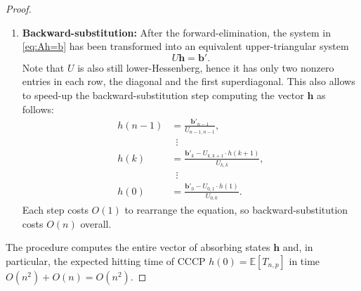\documentclass[11pt,a4paper]{article}
\newcommand{\E}{\mathbb{E}}
\begin{document}
\begin{proof}
\begin{enumerate}
    As $A$ is lower-Hessenberg, the first row has only two nonzero entries: when we subtract it from all rows below, only $O(n)$ terms are affected instead of $O(n^2)$.
    After eliminating the first column, also the second row has only two nonzero entries, and so on iteratively for every row.
    This property allows to perform the forward-elimination step efficiently.
    More formally, for each $c=0,\dots,n-2$, for each $r>c$, let $m_{r,c} := A_{r,c}/A_{c,c}$ and perform the following updates:
    \begin{align*}
        A_{r,c} &\gets A_{r,c} - m_{r,c} \cdot A_{c,c} = 0,
        \\
        A_{r,c+1} &\gets A_{r,c+1} - m_{r,c} \cdot A_{c,c+1},
        \\
        \mathbf{b}_{r} &\gets \mathbf{b}_{r} - m_{r,c} \cdot \mathbf{b}_{c}.
    \end{align*}
    For each $c$ there are $n-c-1$ entries below the diagonal that need to be eliminated, and each elimination step only updates two entries of $A$ and one entry of $\mathbf{b}$.
    Hence, summing over all columns, we have a total running time of $\sum_{c=0}^{n-2} 3(n-c-1) = O(n^2)$.

  \item \textbf{Backward-substitution:} After the forward-elimination, the system in \cref{eq:Ah=b} has been transformed into an equivalent upper-triangular system
    \[
        U \mathbf{h} = \mathbf{b}'.
    \]
    Note that $U$ is also still lower-Hessenberg, hence it has only two nonzero entries in each row, the diagonal and the first superdiagonal. 
    This also allows to speed-up the backward-substitution step computing the vector $\mathbf{h}$ as follows:
    \begin{align*}
        h(n-1) &= \frac{\mathbf{b}'_{n-1}}{U_{n-1,n-1}},
        \\
        & \,\,\,\vdots
        \\
        h(k) &= \frac{\mathbf{b}'_k - U_{k,k+1} \cdot h(k+1)}{U_{k,k}},
        \\
        & \,\,\,\vdots
        \\
        h(0) &= \frac{\mathbf{b}'_0 - U_{0,1} \cdot h(1)}{U_{0,0}}.
    \end{align*}
    Each step costs $O(1)$ to rearrange the equation, so backward-substitution costs $O(n)$ overall.
\end{enumerate}
The procedure computes the entire vector of absorbing states $\mathbf{h}$ and, in particular, the expected hitting time of CCCP $h(0)=\E[T_{n,p}]$ in time $O(n^2) + O(n) = O(n^2)$.
\end{proof}
\end{document}
